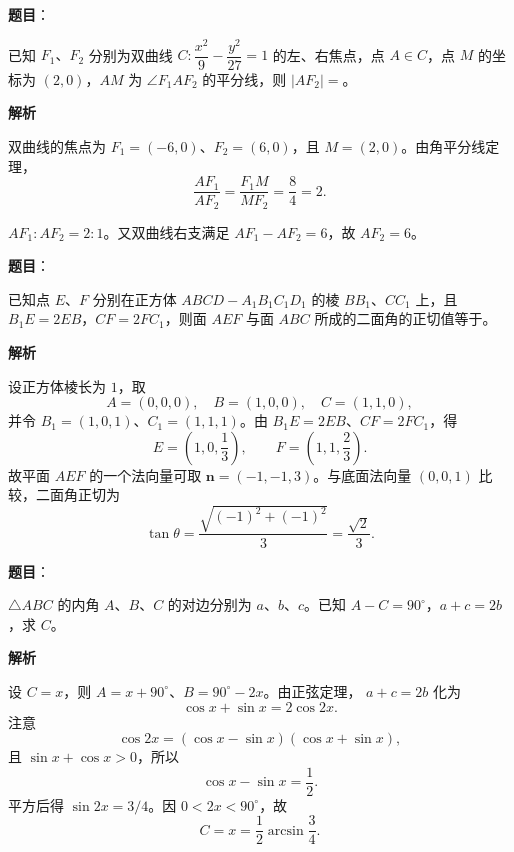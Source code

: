 \begin{answer}

\textbf{题目}：

已知 $F_1\text{、}F_2$ 分别为双曲线 $C:\dfrac{x^2}{9}-\dfrac{y^2}{27}=1$ 的左、右焦点，点 $A\in C$，点 $M$ 的坐标为 $(2,0)$，$AM$ 为 $\angle F_1AF_2$ 的平分线，则 $|AF_2|=$\gkblank{}。

\textbf{解析}

双曲线的焦点为 $F_1=(-6,0)$、$F_2=(6,0)$，且
$M=(2,0)$。由角平分线定理，
\nopagebreak[4]
\[
\frac{AF_1}{AF_2}=\frac{F_1M}{MF_2}=\frac84=2.
\]

$AF_1:AF_2=2:1$。又双曲线右支满足
$AF_1-AF_2=6$，故 $AF_2=6$。


\end{answer}
\begin{answer}

\textbf{题目}：

已知点 $E\text{、}F$ 分别在正方体 $ABCD-A_1B_1C_1D_1$ 的棱 $BB_1\text{、}CC_1$ 上，且 $B_1E=2EB$，$CF=2FC_1$，则面 $AEF$ 与面 $ABC$ 所成的二面角的正切值等于\gkblank{}。

\textbf{解析}

设正方体棱长为 $1$，取
\nopagebreak[4]
\[
A=(0,0,0),\quad B=(1,0,0),\quad C=(1,1,0),
\]
并令 $B_1=(1,0,1)$、$C_1=(1,1,1)$。由
$B_1E=2EB$、$CF=2FC_1$，得
\nopagebreak[4]
\[
E=\left(1,0,\frac13\right),\qquad
F=\left(1,1,\frac23\right).
\]
故平面 $AEF$ 的一个法向量可取
$\boldsymbol n=(-1,-1,3)$。与底面法向量
$(0,0,1)$ 比较，二面角正切为
\nopagebreak[4]
\[
\tan\theta=\frac{\sqrt{(-1)^2+(-1)^2}}3
=\frac{\sqrt2}{3}.
\]


\end{answer}
\begin{answer}

\textbf{题目}：

$\triangle ABC$ 的内角 $A\text{、}B\text{、}C$ 的对边分别为 $a\text{、}b\text{、}c$。已知 $A-C=90^\circ$，$a+c=2b$，求 $C$。

\textbf{解析}

设 $C=x$，则 $A=x+90^\circ$、$B=90^\circ-2x$。由正弦定理，
$a+c=2b$ 化为
\nopagebreak[4]
\[
\cos x+\sin x=2\cos2x.
\]
注意
\nopagebreak[4]
\[
\cos2x=(\cos x-\sin x)(\cos x+\sin x),
\]
且 $\sin x+\cos x>0$，所以
\nopagebreak[4]
\[
\cos x-\sin x=\frac12.
\]
平方后得 $\sin2x=3/4$。因 $0<2x<90^\circ$，故
\nopagebreak[4]
\[
C=x=\frac12\arcsin\frac34.
\]


\end{answer}
